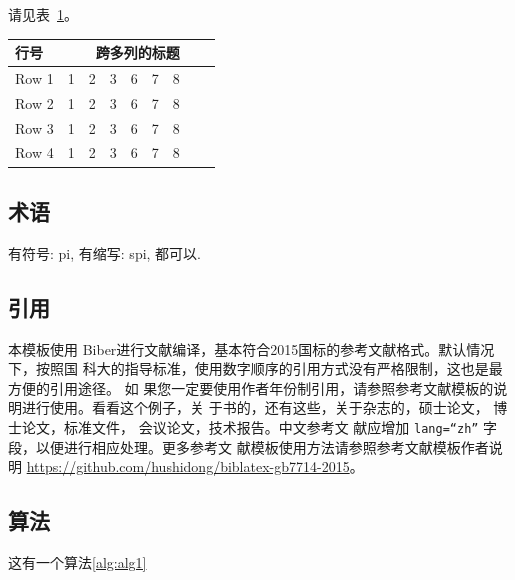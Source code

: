 请见表~\ref{tab:sample}。
\begin{table}[!htbp]
    \label{tab:sample}
    \centering
    \footnotesize%
    \setlength{\tabcolsep}{4pt}%
    \renewcommand{\arraystretch}{1.2}%
    \begin{tabular}{lcccccccc}
        \toprule
        行号    & \multicolumn{8}{c}{跨多列的标题}                                           \\
        \midrule
        Row 1 & 1 & 2 & 3 & 6 & 7 & 8 \\
        Row 2 & 1 & 2 & 3 & 6 & 7 & 8 \\
        Row 3 & 1 & 2 & 3 & 6 & 7 & 8 \\
        Row 4 & 1 & 2 & 3 & 6 & 7 & 8 \\
        \bottomrule
    \end{tabular}
\end{table}

\subsection{术语}

有符号: \gls{pi}, 有缩写: \gls{spi}, 都可以.

\subsection{引用}
本模板使用 Biber进行文献编译，基本符合2015国标的参考文献格式。默认情况下，按照国
科大的指导标准，使用数字顺序的引用方式没有严格限制，这也是最方便的引用途径。 如
果您一定要使用作者年份制引用，请参照参考文献模板的说明进行使用。看看这个例子，关
于书的\cite{tex, companion, ColdSources}，还有这些\cite{Krasnogor2004e, clzs,
zjsw}，关于杂志的\cite{ELIDRISSI94, MELLINGER96, SHELL02}，硕士论文\cite{zhubajie, metamori2004}，
博士论文\cite{shaheshang, FistSystem01}，标准文件\cite{IEEE-1363}，
会议论文\cite{DPMG,kocher99}，技术报告\cite{NPB2}。中文参考文
献\cite{cnarticle}应增加 \texttt{lang=``zh''} 字段，以便进行相应处理。更多参考文
献模板使用方法请参照参考文献模板作者说明
\url{https://github.com/hushidong/biblatex-gb7714-2015}。

\subsection{算法}

这有一个算法\ref{alg:alg1}

